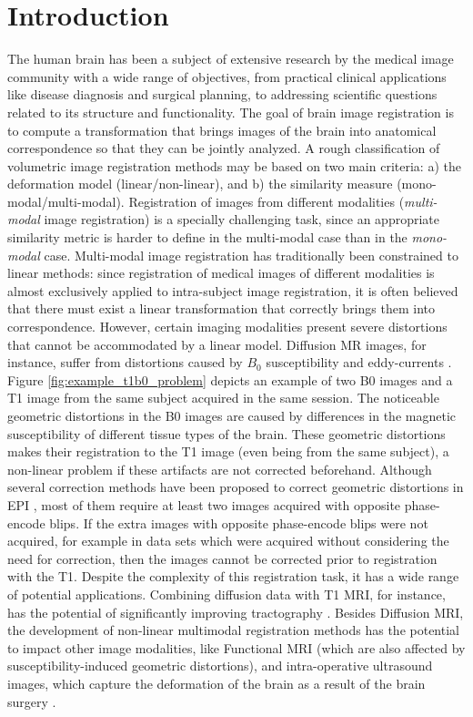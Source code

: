 \section{Introduction}
The human brain has been a subject of extensive research by the medical image community with a wide range of objectives, from practical clinical applications like disease diagnosis and surgical planning, to addressing scientific questions related to its structure and functionality. The goal of brain image registration is to compute a transformation that brings images of the brain into anatomical correspondence so that they can be jointly analyzed. A rough classification of volumetric image registration methods may be based on two main criteria: a) the deformation model (linear/non-linear), and b) the similarity measure (mono-modal/multi-modal). Registration of images from different modalities (\emph{multi-modal} image registration) is a specially challenging task, since an appropriate similarity metric is harder to define in the multi-modal case than in the \emph{mono-modal} case. Multi-modal image registration has traditionally been constrained to linear methods: since registration of medical images of different modalities is almost exclusively applied to intra-subject image registration, it is often believed that there must exist a linear transformation that correctly brings them into correspondence. However, certain imaging modalities present severe distortions that cannot be accommodated by a linear model. Diffusion MR images, for instance, suffer from distortions caused by $B_{0}$ susceptibility and eddy-currents \citep{Tournier2011, Andersson2003}. Figure \ref{fig:example_t1b0_problem} depicts an example of two B0 images and a T1 image from the same subject acquired in the same session. The noticeable geometric distortions in the B0 images are caused by differences in the magnetic susceptibility of different tissue types of the brain. These geometric distortions makes their registration to the T1 image (even being from the same subject), a non-linear problem if these artifacts are not corrected beforehand. Although several correction methods have been proposed to correct geometric distortions in EPI \citep{Andersson2003, Holland2010, Ruthotto, Irfanoglu2014}, most of them require at least two images acquired with opposite phase-encode blips. If the extra images with opposite phase-encode blips were not acquired, for example in data sets which were acquired without considering the need for correction, then the images cannot be corrected prior to registration with the T1. Despite the complexity of this registration task, it has a wide range of potential applications. Combining diffusion data with T1 MRI, for instance, has the potential of significantly improving tractography \citep{Smith2012, Girard2014}. Besides Diffusion MRI, the development of non-linear multimodal registration methods has the potential to impact other image modalities, like Functional MRI (which are also affected by susceptibility-induced geometric distortions), and intra-operative ultrasound images, which capture the deformation of the brain as a result of the brain surgery \citep{Rivaz2015, DeNigris2012}.

